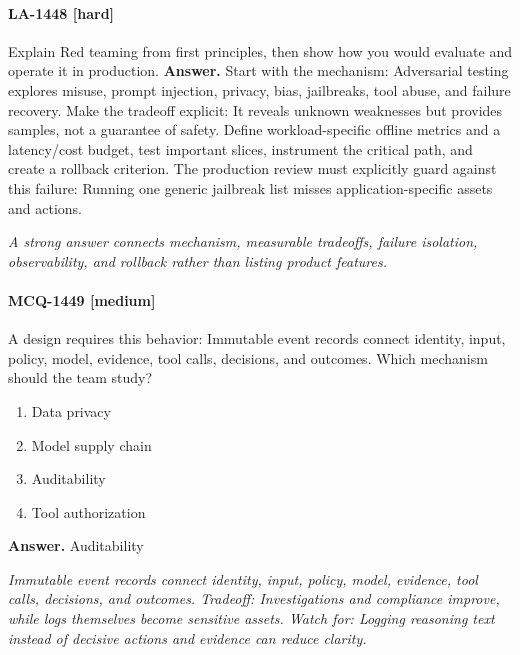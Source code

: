 \paragraph{LA-1448 [hard]} Explain Red teaming from first principles, then show how you would evaluate and operate it in production.
\noindent\textbf{Answer.} Start with the mechanism: Adversarial testing explores misuse, prompt injection, privacy, bias, jailbreaks, tool abuse, and failure recovery. Make the tradeoff explicit: It reveals unknown weaknesses but provides samples, not a guarantee of safety. Define workload-specific offline metrics and a latency/cost budget, test important slices, instrument the critical path, and create a rollback criterion. The production review must explicitly guard against this failure: Running one generic jailbreak list misses application-specific assets and actions.
\par\textit{A strong answer connects mechanism, measurable tradeoffs, failure isolation, observability, and rollback rather than listing product features.}
\paragraph{MCQ-1449 [medium]} A design requires this behavior: Immutable event records connect identity, input, policy, model, evidence, tool calls, decisions, and outcomes. Which mechanism should the team study?
\begin{enumerate}[label=\Alph*.]
\item Data privacy
\item Model supply chain
\item Auditability
\item Tool authorization
\end{enumerate}
\noindent\textbf{Answer.} Auditability
\par\textit{Immutable event records connect identity, input, policy, model, evidence, tool calls, decisions, and outcomes. Tradeoff: Investigations and compliance improve, while logs themselves become sensitive assets. Watch for: Logging reasoning text instead of decisive actions and evidence can reduce clarity.}

